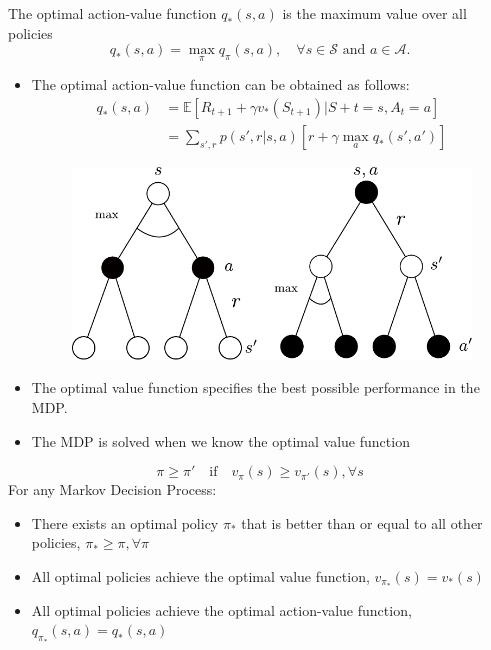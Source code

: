 \begin{definition}
	The optimal action-value function $q_{*}(s, a)$ is the maximum value over all policies
	$$q_{*}(s,a) = \max_{\pi} q_{\pi}(s,a), \quad \forall s\in \mathcal{S} \textrm{ and } a\in \mathcal{A}.$$
\end{definition}
\begin{itemize}
	\item The optimal action-value function can be obtained as follows:
		\begin{align*}
		q_{*}(s,a) &= \mathbb{E}[R_{t+1}+\gamma v_*(S_{t+1})|S+t=s, A_t=a]\\
		&= \sum_{s',r}p(s',r|s,a)[r + \gamma \max_a q_*(s',a')]
		\end{align*}
		\begin{figure}[h]
			\centering
			\includegraphics[scale=0.5]{./images/optimal_action.pdf}
		\end{figure}
	\item The optimal value function specifies the best possible performance in the MDP.
	\item The MDP is solved when we know the optimal value function
\end{itemize}

\begin{theorem}
	$$\pi\geq \pi' \quad\textrm{if}\quad v_\pi(s) \geq v_{\pi'}(s), \forall s$$
	For any Markov Decision Process:
	\begin{itemize}
		\item There exists an optimal policy $\pi_*$ that is better than or equal to all other policies, $\pi_*\geq \pi, \forall \pi$
		\item All optimal policies achieve the optimal value function, $v_{\pi_*}(s) = v_*(s)$
		\item All optimal policies achieve the optimal action-value function, $q_{\pi_*}(s,a) = q_{*}(s,a)$
	\end{itemize}
\end{theorem}

